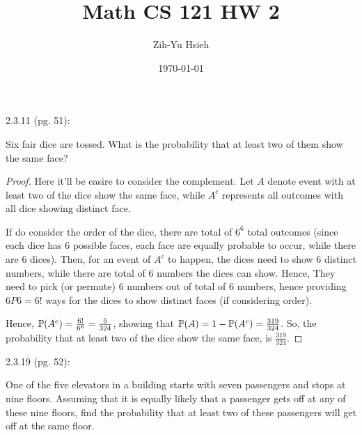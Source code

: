 \documentclass{article}
\title{Math CS 121 HW 2}
\author{Zih-Yu Hsieh}
\date{\today}
\begin{document}
\maketitle

\begin{ques}\label{q1}
    2.3.11 (pg. 51):

    Six fair dice are tossed. What is the probability that at least two of them show the same face?
\end{ques}

\begin{proof}
    Here it'll be easire to consider the complement. Let $A$ denote event with at least two of the dice show the same face, while $A^c$ represents all outcomes with all dice showing distinct face.

    If do consider the order of the dice, there are total of $6^6$ total outcomes (since each dice has $6$ possible faces, each face are equally probable to occur, while there are $6$ dices). Then, for an event of $A^c$ to happen, the dices need to show $6$ distinct numbers, while there are total of $6$ numbers the dices can show. Hence, They need to pick (or permute) $6$ numbers out of total of $6$ numbers, hence providing $6P6 = 6!$ ways for the dices to show distinct faces (if considering order).

    Hence, $\mathbb{P}(A^c) = \frac{6!}{6^6} = \frac{5}{324}$, showing that $\mathbb{P}(A)=1-\mathbb{P}(A^c)=\frac{319}{324}$. So, the probability that at least two of the dice show the same face, is $\frac{319}{324}$.
\end{proof}

\hfil

\begin{ques}\label{q2}
    2.3.19 (pg. 52):

    One of the five elevators in a building starts with seven passengers and stops at nine floors. Assuming that it is equally likely that a passenger gets off at any of these nine floors, find the probability that at least two of these passengers will get off at the same floor.
\end{ques}
\end{document}
